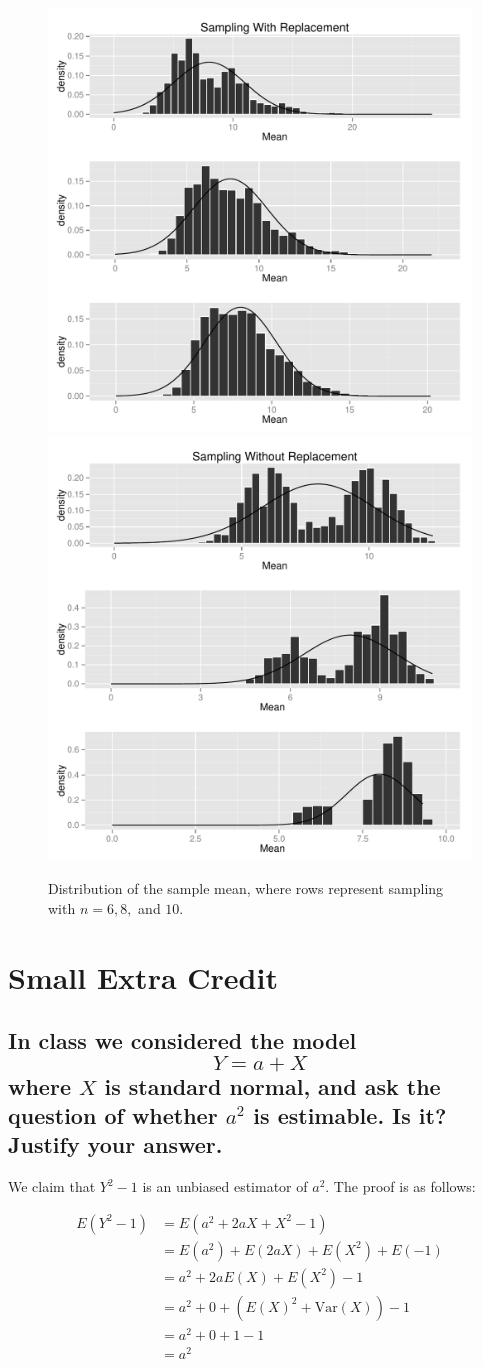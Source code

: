 \documentclass[11pt]{article}
\begin{document}
\begin{figure}[H]
\centering
\includegraphics[width = .5\textwidth]{histogram_ec_wr.pdf}\includegraphics[width = .5\textwidth]{histogram_ec_nr.pdf}
\caption{Distribution of the sample mean, where rows represent sampling with $n=6, 8,$ and $10$.}\label{fig:ec}
\end{figure}


\pagebreak



\section*{Small Extra Credit}
\subsection*{In class we considered the model
$$Y=a+X$$
where $X$ is standard normal, and ask the question of whether $a^2$ is estimable. Is it? Justify your answer.}

We claim that $Y^2 - 1$ is an unbiased estimator of $a^2$. The proof is as follows:

\begin{align*}
E(Y^2 - 1) &= E(a^2 + 2aX + X^2 - 1) \\
&= E(a^2) + E(2aX) + E(X^2) + E(-1) \\
&= a^2 + 2aE(X) + E(X^2) - 1 \\
&= a^2 + 0 + (E(X)^2 + \text{Var}(X)) - 1 \\
&= a^2 + 0 + 1 - 1\\
&= a^2
\end{align*}
\end{document}

